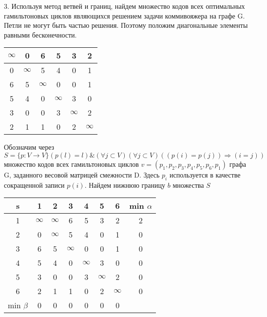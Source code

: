 \documentclass[a4paper,10pt]{report} %
\begin{document}
\smallskip

3. \quad Используя метод ветвей и границ, найдем множество кодов всех оптимальных гамильтоновых
 циклов являющихся решением задачи коммивояжера на графе G.
Петли не могут быть частью решения. Поэтому положим диагональные элементы равными бесконечности.

\begin{flushleft}\begin{tabular}[]{|c|c|c|c|c|c}
\hline
$\infty$ &      0 &      6 &      5 &      3 &      2\\
\hline
	  0 & $\infty$ &      5 &      4 &      0 &      1\\
\hline
      6 &      5 & $\infty$ &      0 &      0 &      1\\
\hline
      5 &      4 &      0 & $\infty$ &      3 &      0\\
\hline
      3 &      0 &      0 &      3 & $\infty$ &      2\\
\hline
      2 &      1 &      1 &      0 &      2 & $\infty$ \\
\hline
\end{tabular}
\end{flushleft}

Обозначим через 
$ S = \{ p:V \rightarrow V \} (p(l) = l) \& ( \forall j \subset V ) ( \forall j \subset V) ((p(i) = p(j)) \Longrightarrow (i = j))$
множество кодов всех гамильтоновых циклов $v=(p_1,p_2,p_3,p_4,p_5,p_6,p_1)$ графа G, 
заданного весовой матрицей смежности D. 
Здесь $p_{i}$ используется в качестве сокращенной записи $p(i)$.
Найдем нижнюю границу $b$ множества $S$

\begin{flushleft}
\begin{tabular}[]{|c|c|c|c|c|c|c|c}
\hline
s & 1 & 2 & 3 & 4 & 5 & 6 & min $\alpha$ \\
\hline
1 & $\infty$ & $\infty$ &      6 &      5 &      3 &      2 & 2\\
\hline
2 &      0 		& $\infty$ &      5 &      4 &      0 &      1 & 0\\
\hline
3 &      6 		&      5 & $\infty$ &      0 &      0 &      1 & 0\\
\hline
4 &      5 		&      4 &      0 & $\infty$ &      3 &      0 & 0\\
\hline
5 &      3 		&      0 &      0 &      3 & $\infty$ &      2 & 0\\
\hline
6 &      2 		&      1 &      1 &      0 &      2 & $\infty$ & 0\\
\hline
min $\beta$ &  0 	&      0 &      0 &      0 &      0 &      0\\
\end{tabular}
\end{flushleft}
\end{document}

